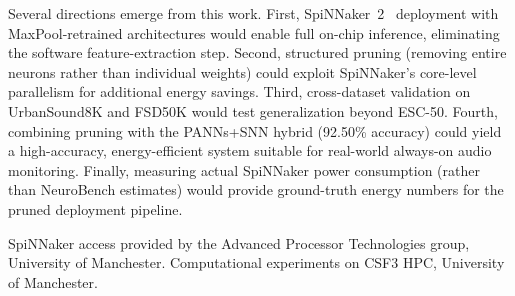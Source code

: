 \documentclass[sigconf,nonacm=false]{acmart}
\begin{document}
Several directions emerge from this work.
First, SpiNNaker~2~\cite{hoppner2024} deployment with MaxPool-retrained architectures would enable full on-chip inference, eliminating the software feature-extraction step.
Second, structured pruning (removing entire neurons rather than individual weights) could exploit SpiNNaker's core-level parallelism for additional energy savings.
Third, cross-dataset validation on UrbanSound8K and FSD50K would test generalization beyond ESC-50.
Fourth, combining pruning with the PANNs+SNN hybrid (92.50\% accuracy) could yield a high-accuracy, energy-efficient system suitable for real-world always-on audio monitoring.
Finally, measuring actual SpiNNaker power consumption (rather than NeuroBench estimates) would provide ground-truth energy numbers for the pruned deployment pipeline.

\begin{acks}
SpiNNaker access provided by the Advanced Processor Technologies group, University of Manchester.
Computational experiments on CSF3 HPC, University of Manchester.
\end{acks}
\end{document}
